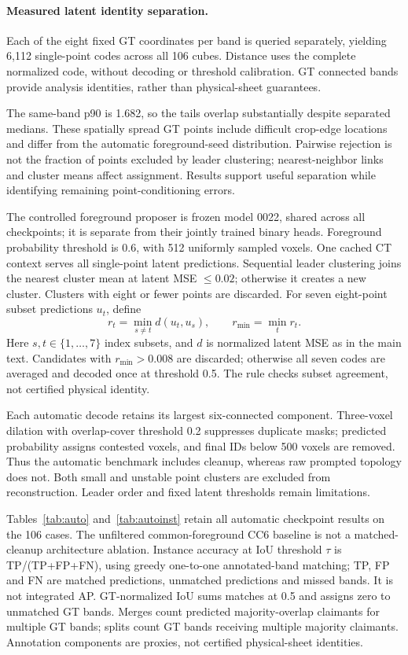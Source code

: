 \paragraph{Measured latent identity separation.}
Each of the eight fixed GT coordinates per band is queried separately, yielding
6,112 single-point codes across all 106 cubes. Distance uses the complete
normalized code, without decoding or threshold calibration. GT connected bands
provide analysis identities, rather than physical-sheet guarantees.

The same-band p90 is 1.682, so the tails overlap substantially despite separated
medians. These spatially spread GT points include difficult crop-edge locations
and differ from the automatic foreground-seed distribution. Pairwise rejection
is not the fraction of points excluded by leader clustering; nearest-neighbor
links and cluster means affect assignment. Results support useful separation
while identifying remaining point-conditioning errors.

The controlled foreground proposer is frozen model 0022, shared across all
checkpoints; it is separate from their jointly trained binary heads.
Foreground probability threshold is 0.6, with 512 uniformly sampled voxels.
One cached CT context serves all single-point latent predictions. Sequential
leader clustering joins the nearest cluster mean at latent MSE $\le0.02$;
otherwise it creates a new cluster. Clusters with eight or fewer points are
discarded. For seven eight-point subset predictions $u_t$, define
\begin{equation}
 r_t=\min_{s\ne t}d(u_t,u_s),\qquad r_{\min}=\min_t r_t.
\end{equation}
Here $s,t\in\{1,\ldots,7\}$ index subsets, and $d$ is normalized latent MSE
as in the main text. Candidates with $r_{\min}>0.008$ are discarded;
otherwise all seven codes are averaged and decoded once at threshold 0.5.
The rule checks subset agreement, not certified physical identity.

Each automatic decode retains its largest six-connected component.
Three-voxel dilation with overlap-cover threshold 0.2 suppresses duplicate
masks; predicted probability assigns contested voxels, and final IDs below
500 voxels are removed. Thus the automatic benchmark includes cleanup,
whereas raw prompted topology does not. Both small and unstable point clusters
are excluded from reconstruction. Leader order and fixed latent thresholds
remain limitations.

Tables~\ref{tab:auto} and~\ref{tab:autoinst} retain all automatic checkpoint
results on the 106 cases. The unfiltered common-foreground CC6 baseline is
not a matched-cleanup architecture ablation. Instance accuracy at IoU threshold
$\tau$ is TP/(TP+FP+FN), using greedy one-to-one annotated-band matching;
TP, FP and FN are matched predictions, unmatched predictions and missed bands.
It is not integrated AP. GT-normalized IoU sums matches at 0.5 and assigns zero
to unmatched GT bands. Merges count predicted majority-overlap claimants for
multiple GT bands; splits count GT bands receiving multiple majority claimants.
Annotation components are proxies, not certified physical-sheet identities.

